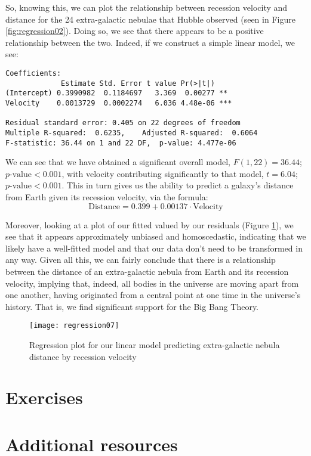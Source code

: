 So, knowing this, we can plot the relationship between recession velocity and distance for the 24 extra-galactic nebulae that Hubble observed (seen in Figure \ref{fig:regression02}). Doing so, we see that there appears to be a positive relationship between the two. Indeed, if we construct a simple linear model, we see:

\begin{framed}
\begin{Verbatim}[samepage=TRUE]
Coefficients:
             Estimate Std. Error t value Pr(>|t|)    
(Intercept) 0.3990982  0.1184697   3.369  0.00277 ** 
Velocity    0.0013729  0.0002274   6.036 4.48e-06 ***

Residual standard error: 0.405 on 22 degrees of freedom
Multiple R-squared:  0.6235,	Adjusted R-squared:  0.6064 
F-statistic: 36.44 on 1 and 22 DF,  p-value: 4.477e-06
\end{Verbatim}
\end{framed}

We can see that we have obtained a significant overall model, $F(1,22) = 36.44$; $p\text{-value}<0.001$, with velocity contributing significantly to that model, $t=6.04$; $p\text{-value}<0.001$. This in turn gives us the ability to predict a galaxy's distance from Earth given its recession velocity, via the formula:
\begin{equation*}
\text{Distance}=0.399+0.00137\cdot\text{Velocity}
\end{equation*}

Moreover, looking at a plot of our fitted valued by our residuals (Figure \ref{fig:regression07}), we see that it appears approximately unbiased and homoscedastic, indicating that we likely have a well-fitted model and that our data don't need to be transformed in any way. Given all this, we can fairly conclude that there is a relationship between the distance of an extra-galactic nebula from Earth and its recession velocity, implying that, indeed, all bodies in the universe are moving apart from one another, having originated from a central point at one time in the universe's history. That is, we find significant support for the Big Bang Theory.

\begin{figure}[h]
\texttt{[image: regression07]}
\label{fig:regression07}
\caption{Regression plot for our linear model predicting extra-galactic nebula distance by recession velocity}
\end{figure}
\section{Exercises}

\section{Additional resources}